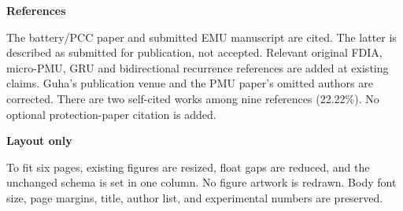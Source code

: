 \documentclass[10pt,letterpaper]{article}
\begin{document}
\textbf{References}\par
The battery/PCC paper and submitted EMU manuscript are cited. The latter is described as submitted for publication, not accepted. Relevant original FDIA, micro-PMU, GRU and bidirectional recurrence references are added at existing claims. Guha's publication venue and the PMU paper's omitted authors are corrected. There are two self-cited works among nine references (22.22\%). No optional protection-paper citation is added.\par
\textbf{Layout only}\par
To fit six pages, existing figures are resized, float gaps are reduced, and the unchanged schema is set in one column. No figure artwork is redrawn. Body font size, page margins, title, author list, and experimental numbers are preserved.\par
\end{document}

